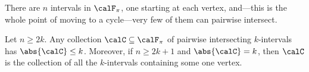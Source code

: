 \begin{figure}[H]
    \centering
\end{figure}

There are $n$ intervals in $\calF_{\pi}$, one starting at each vertex, and---this is the whole point of moving to a cycle---very few of them can pairwise intersect.

\begin{boxlemma} \label{Ch2:Lemma:Intersecting_Intervals}
    Let $n \geq 2k$. Any collection $\calC \subseteq \calF_{\pi}$ of pairwise intersecting $k$-intervals has $\abs{\calC} \leq k$. Moreover, if $n \geq 2k + 1$ and $\abs{\calC} = k$, then $\calC$ is the collection of all the $k$-intervals containing some one vertex.
\end{boxlemma}
